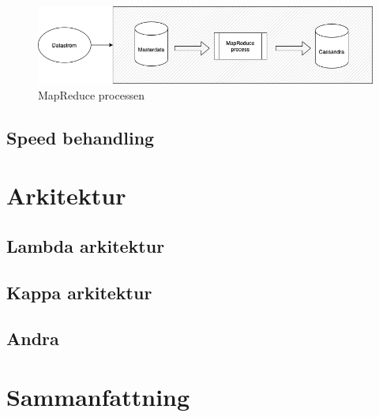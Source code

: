 \begin{figure}[h]
    \centering
    \includegraphics[scale=0.5]{src/thesis/img/batch-pipeline.png}
    \caption{MapReduce processen}
    \label{fig:mesh1}
\end{figure}

\section{Speed behandling}

\chapter{Arkitektur}

\section{Lambda arkitektur}

\section{Kappa arkitektur}

\section{Andra}

\chapter{Sammanfattning}
